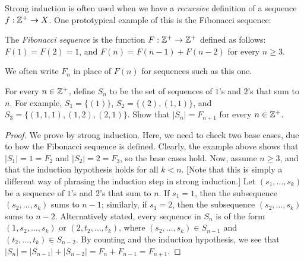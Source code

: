 \documentclass{article}
\begin{document}
Strong induction is often used when we have a \textit{recursive} definition of a sequence $f: \mathbb Z^+ \to X$. One prototypical example of this is the Fibonacci sequence:
\begin{definition}\label{fibonacci}
The \textit{Fibonacci sequence} is the function $F: \mathbb Z^+ \to \mathbb Z^+$ defined as follows: $F(1) = F(2) = 1$, and $F(n) = F(n-1) + F(n-2)$ for every $n\geq 3$.
\end{definition}
We often write $F_n$ in place of $F(n)$ for sequences such as this one.
\newpage
\begin{example}
For every $n\in\mathbb Z^+$, define $S_n$ to be the set of sequences of $1$'s and $2$'s that sum to $n$. For example, $S_1 = \{(1)\}$, $S_2 = \{(2), (1, 1)\}$, and $S_3 = \{(1,1,1), (1,2), (2,1)\}$. Show that $|S_n| = F_{n+1}$ for every $n\in\mathbb Z^+$.
\end{example}
\begin{proof}
We prove by strong induction. Here, we need to check two base cases, due to how the Fibonacci sequence is defined. Clearly, the example above shows that $|S_1| = 1 = F_2$ and $|S_2| = 2 = F_3$, so the base cases hold. Now, assume $n\geq 3$, and that the induction hypothesis holds for all $k < n$. [Note that this is simply a different way of phrasing the induction step in strong induction.] Let $(s_1, \ldots, s_k)$ be a sequence of $1$'s and $2$'s that sum to $n$. If $s_1 = 1$, then the subsequence $(s_2, \ldots, s_k)$ sums to $n-1$; similarly, if $s_1 = 2$, then the subsequence $(s_2, \ldots, s_k)$ sums to $n-2$. Alternatively stated, every sequence in $S_n$ is of the form $(1, s_2, \ldots, s_k)$ or $(2, t_2, \ldots, t_k)$, where $(s_2, \ldots, s_k)\in S_{n-1}$ and $(t_2, \ldots, t_k)\in S_{n-2}$. By counting and the induction hypothesis, we see that $|S_n| = |S_{n-1}| + |S_{n-2}| = F_n + F_{n-1} = F_{n+1}$.
\end{proof}
\end{document}
